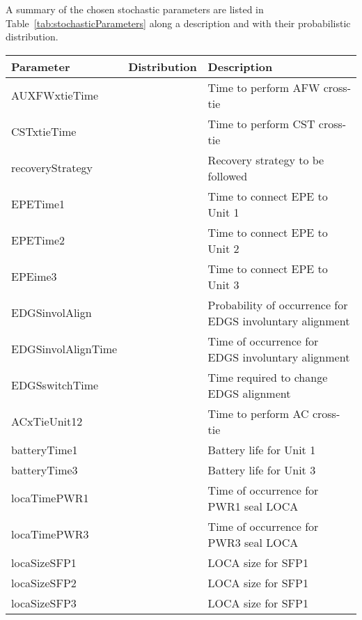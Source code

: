 A summary of the chosen stochastic parameters are listed in Table~\ref{tab:stochasticParameters} 
along a description and with their probabilistic distribution.

\begin{table}
  \begin{center}
      \begin{tabular}{ | l | p{5cm} | p{5cm} |}
        \hline
        Parameter          & Distribution & Description       \\ \hline \hline
        AUXFWxtieTime      &              & Time to perform AFW cross-tie  \\ \hline
        CSTxtieTime        &              & Time to perform CST cross-tie \\ \hline
        recoveryStrategy   &              & Recovery strategy to be followed   \\ \hline
        EPETime1           &              & Time to connect EPE to Unit 1   \\ \hline
        EPETime2           &              & Time to connect EPE to Unit 2   \\ \hline
        EPEime3            &              & Time to connect EPE to Unit 3   \\ \hline
        EDGSinvolAlign     &              & Probability of occurrence for EDGS involuntary alignment   \\ \hline
        EDGSinvolAlignTime &              & Time of occurrence for EDGS involuntary alignment   \\ \hline
        EDGSswitchTime     &              & Time required to change EDGS alignment   \\ \hline
        ACxTieUnit12       &              & Time to perform AC cross-tie   \\ \hline
        batteryTime1       &              & Battery life for Unit 1   \\ \hline
        batteryTime3       &              & Battery life for Unit 3   \\ \hline
        locaTimePWR1       &              & Time of occurrence for PWR1 seal LOCA   \\ \hline
        locaTimePWR3       &              & Time of occurrence for PWR3 seal LOCA   \\ \hline
        locaSizeSFP1       &              & LOCA size for SFP1   \\ \hline
        locaSizeSFP2       &              & LOCA size for SFP1   \\ \hline
        locaSizeSFP3       &              & LOCA size for SFP1   \\ \hline    

\end{tabular}
\end{center}
\end{table}

